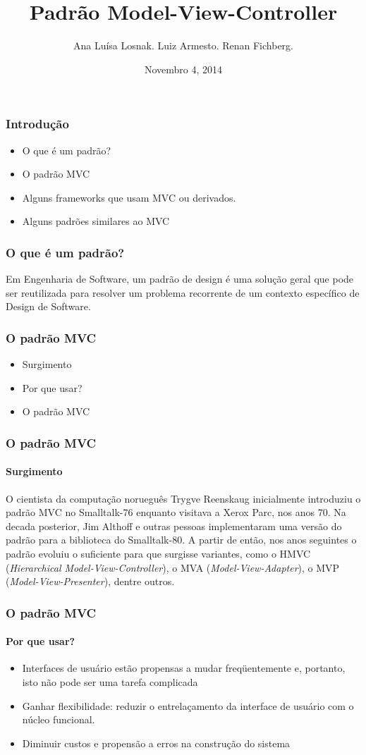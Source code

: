 \documentclass{beamer}
\title[Padrão Model-View-Controller]{Padrão Model-View-Controller}
\author{Ana Luísa Losnak. Luiz Armesto. Renan Fichberg.}
\date{Novembro 4, 2014}
\institute{Instituto de Matemática e Estatística da Universidade de São Paulo (IME-USP)}
\begin{document}
\begin{frame}
\titlepage
\end{frame}

\begin{frame}
\frametitle{Introdução}
\begin{itemize}
	\item O que é um padrão?
	\item O padrão MVC
	\item Alguns frameworks que usam MVC ou derivados.
	\item Alguns padrões similares ao MVC
\end{itemize}
\end{frame}

\begin{frame}
\frametitle{O que é um padrão?}
	Em Engenharia de Software, um padrão de design é uma solução geral que pode ser reutilizada para resolver um problema recorrente de um contexto específico de Design de Software.
\end{frame}

\begin{frame}
\frametitle{O padrão MVC}
\begin{itemize}
	\item Surgimento
	\item Por que usar?
	\item O padrão MVC
\end{itemize}
\end{frame}

\begin{frame}
\frametitle{O padrão MVC}
\framesubtitle{Surgimento}
	O cientista da computação norueguês Trygve Reenskaug inicialmente introduziu o padrão MVC no Smalltalk-76 enquanto visitava a Xerox Parc, nos anos 70. Na decada posterior, Jim Althoff e outras pessoas implementaram uma versão do padrão para a biblioteca do Smalltalk-80. A partir de então, nos anos seguintes o padrão evoluiu o suficiente para que surgisse variantes, como o HMVC (\textit{Hierarchical Model-View-Controller}), o MVA (\textit{Model-View-Adapter}), o MVP (\textit{Model-View-Presenter}), dentre outros.
\end{frame}

\begin{frame}
\frametitle{O padrão MVC}
\framesubtitle{Por que usar?}
\begin{itemize}
	\item Interfaces de usuário estão propensas a mudar freqüentemente e, portanto, isto não pode ser uma tarefa complicada
	\item Ganhar flexibilidade: reduzir o entrelaçamento da interface de usuário com o núcleo funcional.
	\item Diminuir custos e propensão a erros na construção do sistema
\end{itemize}
\end{frame}
\end{document}
